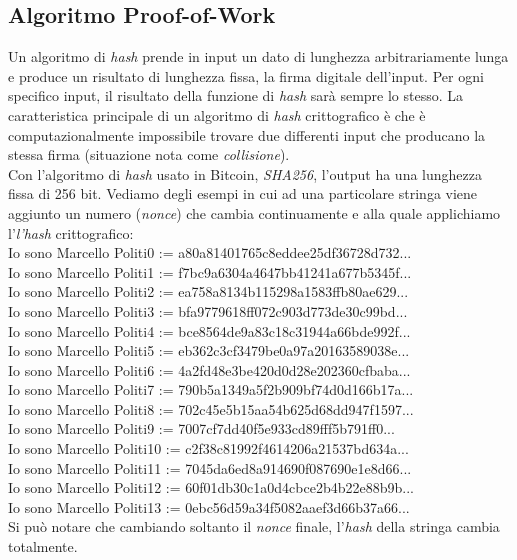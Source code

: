 \subsection{Algoritmo Proof-of-Work}
Un algoritmo di \textit{hash} prende in input un dato di lunghezza arbitrariamente lunga e produce un risultato di lunghezza fissa, la firma digitale dell'input. Per ogni specifico input, il risultato della funzione di \textit{hash} sar\`a sempre lo stesso. La caratteristica principale di un algoritmo di \textit{hash} crittografico \`e che \`e computazionalmente impossibile trovare due differenti input che producano la stessa firma (situazione nota come \textit{collisione}).\\
Con l'algoritmo di \textit{hash} usato in Bitcoin, \textit{SHA256}, l'output ha una lunghezza fissa di 256 bit. Vediamo degli esempi in cui ad una particolare stringa viene aggiunto un numero (\textit{nonce}) che cambia continuamente e alla quale applichiamo l'\textit{l'hash} crittografico:\\
Io sono Marcello Politi0 := a80a81401765c8eddee25df36728d732...\\
Io sono Marcello Politi1 := f7bc9a6304a4647bb41241a677b5345f...\\
Io sono Marcello Politi2 := ea758a8134b115298a1583ffb80ae629...\\
Io sono Marcello Politi3 := bfa9779618ff072c903d773de30c99bd...\\
Io sono Marcello Politi4 := bce8564de9a83c18c31944a66bde992f...\\
Io sono Marcello Politi5 := eb362c3cf3479be0a97a20163589038e...\\
Io sono Marcello Politi6 := 4a2fd48e3be420d0d28e202360cfbaba...\\
Io sono Marcello Politi7 := 790b5a1349a5f2b909bf74d0d166b17a...\\
Io sono Marcello Politi8 := 702c45e5b15aa54b625d68dd947f1597...\\
Io sono Marcello Politi9 := 7007cf7dd40f5e933cd89fff5b791ff0...\\
Io sono Marcello Politi10 := c2f38c81992f4614206a21537bd634a...\\
Io sono Marcello Politi11 := 7045da6ed8a914690f087690e1e8d66...\\
Io sono Marcello Politi12 := 60f01db30c1a0d4cbce2b4b22e88b9b...\\
Io sono Marcello Politi13 := 0ebc56d59a34f5082aaef3d66b37a66...\\
Si pu\`o notare che cambiando soltanto il \textit{nonce} finale, l'\textit{hash} della stringa cambia totalmente.\\
